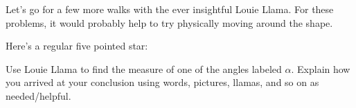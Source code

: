\documentclass[nooutcomes,noauthor,hints,handout]{ximera}
\begin{document}
%
  Let's go for a few more walks with the ever insightful Louie Llama. For these problems, it would probably help to try physically moving around the shape.

\begin{question}
  Here's a regular five pointed star:
    \begin{center}
    \end{center}
    Use Louie Llama to find the measure of one of the angles labeled
    $\alpha$. Explain how you arrived at your conclusion using words,
    pictures, llamas, and so on as needed/helpful.
\end{question}
\end{document}
